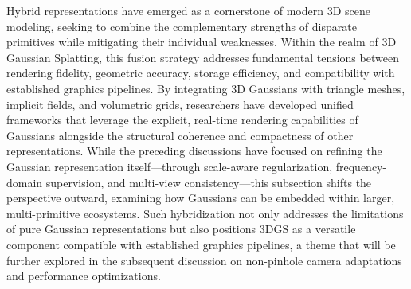 \documentclass[11pt]{article}
\begin{document}
Hybrid representations have emerged as a cornerstone of modern 3D scene modeling, seeking to combine the complementary strengths of disparate primitives while mitigating their individual weaknesses. Within the realm of 3D Gaussian Splatting, this fusion strategy addresses fundamental tensions between rendering fidelity, geometric accuracy, storage efficiency, and compatibility with established graphics pipelines. By integrating 3D Gaussians with triangle meshes, implicit fields, and volumetric grids, researchers have developed unified frameworks that leverage the explicit, real-time rendering capabilities of Gaussians alongside the structural coherence and compactness of other representations. While the preceding discussions have focused on refining the Gaussian representation itself---through scale-aware regularization, frequency-domain supervision, and multi-view consistency---this subsection shifts the perspective outward, examining how Gaussians can be embedded within larger, multi-primitive ecosystems. Such hybridization not only addresses the limitations of pure Gaussian representations but also positions 3DGS as a versatile component compatible with established graphics pipelines, a theme that will be further explored in the subsequent discussion on non-pinhole camera adaptations and performance optimizations.
\end{document}
